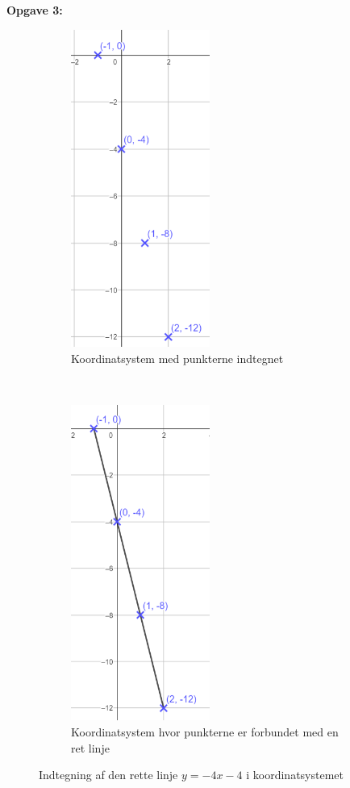 \newpage

\textbf{Opgave 3:}

\begin{figure}[ht]
    \centering
    \begin{subfigure}[t]{0.5\textwidth}
        \centering
        \includegraphics[width=0.5\textwidth, height=0.8\textwidth]{img_7}
        \caption{Koordinatsystem med punkterne indtegnet}
    \end{subfigure}%
    ~ 
    \begin{subfigure}[t]{0.5\textwidth}
        \centering
        \includegraphics[width=0.5\textwidth, height=0.8\textwidth]{img_8}
        \caption{Koordinatsystem hvor punkterne er forbundet med en ret linje}
    \end{subfigure}
    \caption{Indtegning af den rette linje $y =-4x - 4 $ i koordinatsystemet}
\end{figure}

